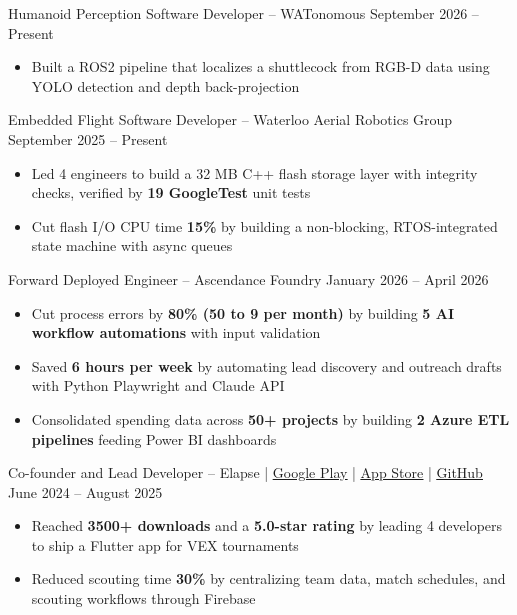 \documentclass[11pt]{article}       %
\newcommand{\textsb}[1]{{\fontseries{sb}\selectfont #1}}
\begin{document}
\vspace{6pt}

\textsb{Humanoid Perception Software Developer} -- WATonomous \hfill September 2026 -- Present \\
\begin{itemize}
    \item Built a ROS2 pipeline that localizes a shuttlecock from RGB-D data using YOLO detection and depth back-projection
\end{itemize}

\vspace{6pt}

\textsb{Embedded Flight Software Developer} -- Waterloo Aerial Robotics Group \hfill September 2025 -- Present \\
\begin{itemize}
    \item Led 4 engineers to build a 32 MB C++ flash storage layer with integrity checks, verified by \textbf{19 GoogleTest} unit tests
    \item Cut flash I/O CPU time \textbf{15\%} by building a non-blocking, RTOS-integrated state machine with async queues
\end{itemize}

\vspace{6pt}

\textsb{Forward Deployed Engineer} -- Ascendance Foundry \hfill January 2026 -- April 2026 \\
\begin{itemize}
    \item Cut process errors by \textbf{80\% (50 to 9 per month)} by building \textbf{5 AI workflow automations} with input validation
    \item Saved \textbf{6 hours per week} by automating lead discovery and outreach drafts with Python Playwright and Claude API
    \item Consolidated spending data across \textbf{50+ projects} by building \textbf{2 Azure ETL pipelines} feeding Power BI dashboards
\end{itemize}

\vspace{6pt}

\textsb{Co-founder and Lead Developer} -- Elapse | \href{https://play.google.com/store/apps/details?id=com.elapseapp.elapse_app&hl=en_CA}{\underline{Google Play}} | \href{https://apps.apple.com/ca/app/elapse/id6596757269}{\underline{App Store}} | \href{https://github.com/elapse-app/elapse}{\underline{GitHub}} \hfill June 2024 -- August 2025 \\
\begin{itemize}
    \item Reached \textbf{3500+ downloads} and a \textbf{5.0-star rating} by leading 4 developers to ship a Flutter app for VEX tournaments
    \item Reduced scouting time \textbf{30\%} by centralizing team data, match schedules, and scouting workflows through Firebase
\end{itemize}
\end{document}
